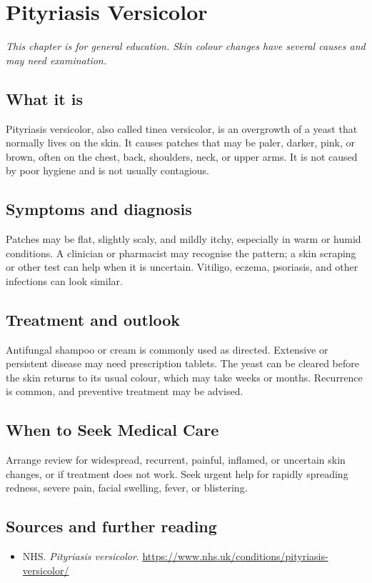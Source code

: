 \chapter{Pityriasis Versicolor}

\medskip
\noindent\textit{This chapter is for general education. Skin colour changes have several causes and may need examination.}

\section*{What it is}
Pityriasis versicolor, also called tinea versicolor, is an overgrowth of a yeast that normally lives on the skin. It causes patches that may be paler, darker, pink, or brown, often on the chest, back, shoulders, neck, or upper arms. It is not caused by poor hygiene and is not usually contagious.

\section*{Symptoms and diagnosis}
Patches may be flat, slightly scaly, and mildly itchy, especially in warm or humid conditions. A clinician or pharmacist may recognise the pattern; a skin scraping or other test can help when it is uncertain. Vitiligo, eczema, psoriasis, and other infections can look similar.

\section*{Treatment and outlook}
Antifungal shampoo or cream is commonly used as directed. Extensive or persistent disease may need prescription tablets. The yeast can be cleared before the skin returns to its usual colour, which may take weeks or months. Recurrence is common, and preventive treatment may be advised.

\section*{When to Seek Medical Care}
Arrange review for widespread, recurrent, painful, inflamed, or uncertain skin changes, or if treatment does not work. Seek urgent help for rapidly spreading redness, severe pain, facial swelling, fever, or blistering.

\section*{Sources and further reading}
\begin{itemize}
\item NHS. \textit{Pityriasis versicolor}. \url{https://www.nhs.uk/conditions/pityriasis-versicolor/}
\end{itemize}
